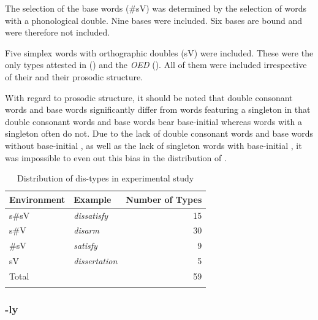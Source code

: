 The selection of the base words (\#sV) was determined by the selection of words with a phonological double. 
Nine bases were included. Six bases are bound and were therefore not included. 

Five simplex words with orthographic doubles (sV) were included. These were the only types attested in  (\citealt{Davies.20082014}) and the \textit{OED} (\citealt{OED.2013}). 
All of them were included irrespective of their  and their prosodic structure. 

With regard to prosodic structure, it should be noted that double consonant words and base words significantly differ from words featuring a singleton in that double consonant words and base words bear base-initial  whereas words with a singleton often do not. Due to the lack of double consonant words and base words without base-initial , as well as the lack of singleton words with base-initial , it was impossible to even out this bias in the distribution of .


\begin{table}[h!]
	\caption{Distribution of dis-types in experimental study}
	\label{tbl:distribution of dis types in experiment}

	
		\begin{tabular} {llr}
\lsptoprule
			Environment & Example & Number of  Types\\

			\midrule
			s\#sV&\color{lsMidBlue}\textit{dissatisfy} & 15 \\ 
			s\#V&\color{lsMidBlue}\textit{disarm} & 30\\ 
			\#sV&\color{lsMidBlue}\textit{satisfy} & 9\\ 
			sV&\color{lsMidBlue}\textit{dissertation} & 5 \\ 
			\midrule   	
			Total&  & 59\\ 
			\lspbottomrule                                                                                
		\end{tabular}
	
\end{table}



\subsubsection{-ly} \label{stimuli ly}


